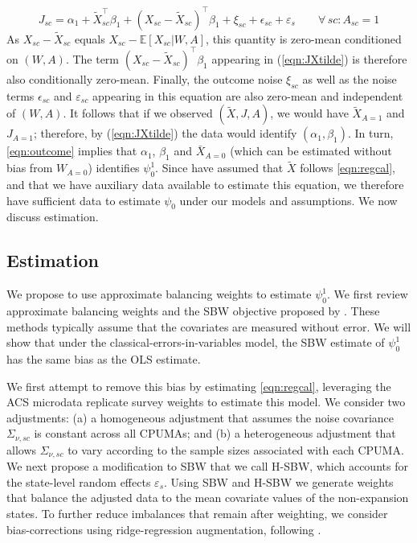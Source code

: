 \documentclass[aoas]{imsart}
\theoremstyle{plain}
\theoremstyle{remark}
\begin{document}
\begin{equation} \label{eqn:JXtilde}
    J_{sc} = \alpha_1 + \tilde{X}_{sc}^\top\beta_1 + (X_{sc} - \tilde{X}_{sc})^\top\beta_1 + \xi_{sc} + \epsilon_{sc} + \varepsilon_s \qquad\forall\, sc: A_{sc} = 1
\end{equation}
As $X_{sc} - \tilde{X}_{sc}$ equals $X_{sc} - \mathbb{E}[X_{sc}|W,A]$, this quantity is zero-mean conditioned on $(W,A)$. The term $(X_{sc} - \tilde{X}_{sc})^\top\beta_1$ appearing in (\ref{eqn:JXtilde}) is therefore also conditionally zero-mean. Finally, the outcome noise $\xi_{sc}$ as well as the noise terms $\epsilon_{sc}$ and $\varepsilon_{sc}$ appearing in this equation are also zero-mean and independent of $(W,A)$. It follows that if we observed $(\tilde{X}, J, A)$, we would have $\tilde{X}_{A=1}$ and $J_{A=1}$; therefore, by (\ref{eqn:JXtilde}) the data would identify $(\alpha_1, \beta_1)$. In turn, \eqref{eqn:outcome} implies that $\alpha_1$, $\beta_1$ and $\bar{X}_{A=0}$ (which can be estimated without bias from $W_{A=0}$) identifies $\psi_0^1$. Since have assumed that $\tilde{X}$ follows \eqref{eqn:regcal}, and that we have auxiliary data available to estimate this equation, we therefore have sufficient data to estimate $\psi_0$ under our models and assumptions. We now discuss estimation.

\subsection{Estimation}\label{ssec:estimation}

We propose to use approximate balancing weights to estimate $\psi_0^1$. We first review approximate balancing weights and the SBW objective proposed by \citet{zubizarreta2015stable}. These methods typically assume that the covariates are measured without error. We will show that under the classical-errors-in-variables model, the SBW estimate of $\psi_0^1$ has the same bias as the OLS estimate.

We first attempt to remove this bias by estimating \eqref{eqn:regcal}, leveraging the ACS microdata replicate survey weights to estimate this model. We consider two adjustments: (a) a homogeneous adjustment that assumes the noise covariance $\Sigma_{\nu, sc}$ is constant across all CPUMAs; and (b) a heterogeneous adjustment that allows $\Sigma_{\nu,sc}$ to vary according to the sample sizes associated with each CPUMA. We next propose a modification to SBW that we call H-SBW, which accounts for the state-level random effects $\varepsilon_s$. Using SBW and H-SBW we generate weights that balance the adjusted data to the mean covariate values of the non-expansion states. To further reduce imbalances that remain after weighting, we consider bias-corrections using ridge-regression augmentation, following \citet{ben2021augmented}. 
\end{document}
